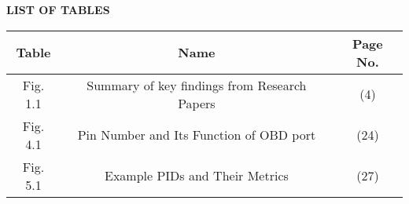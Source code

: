 \newpage
\begin{center}
\textbf{\LARGE LIST OF TABLES}\\[1cm]
\end{center}
\begin{table}[h]
    \large
    \centering
    \begin{tabular}{|c|c|c|} %
        \hline
        \textbf{Table} & \textbf{Name} & \textbf{Page No.} \\[1cm] 
        \hline
        Fig. 1.1 & Summary of key findings from Research Papers & (4) \\[1cm]
        \hline
        Fig. 4.1 & Pin Number and Its Function of OBD port & (24) \\[1cm]
        \hline
        Fig. 5.1 & Example PIDs and Their Metrics & (27) \\[1cm]
        \hline
    \end{tabular}
\end{table}


